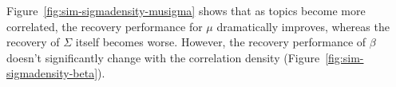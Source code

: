 \documentclass[12pt,a4paper,twoside,openright]{report}
\begin{document}
Figure~\ref{fig:sim-sigmadensity-musigma} shows that as topics become more correlated, the recovery performance for $\mu$ dramatically improves, whereas the recovery of $\Sigma$ itself becomes worse. However, the recovery performance of $\beta$ doesn't significantly change with the correlation density (Figure~\ref{fig:sim-sigmadensity-beta}).

%
%
%
\end{document}
